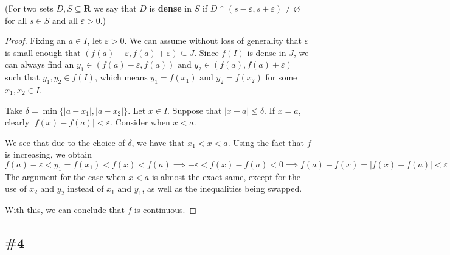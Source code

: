 \documentclass{article}
\newcommand{\R}{\mathbf{R}}
\theoremstyle{plain} %
\numberwithin{thm}{section} %
\theoremstyle{definition}
\begin{document}
    (For two sets $D,S\subseteq \R$ we say that $D$ is \textbf{dense} in $S$ if $D\cap (s-\varepsilon,s+\varepsilon)\neq\varnothing$ for all $s\in S$ and all $\varepsilon>0$.)
    \begin{proof}
        Fixing an \(a \in I\), let \(\varepsilon > 0\). We can assume without loss of generality that \(\varepsilon \) is small enough that \((f(a) - \varepsilon , f(a) + \varepsilon ) \subseteq J\). Since \(f(I)\) is dense in \(J\), we can always find an \(y_1 \in (f(a) - \varepsilon , f(a)) \text{ and } y_2 \in (f(a), f(a) + \varepsilon )\) such that \(y_1 , y_2 \in f(I)\), which means \(y_1 = f(x_1) \text{ and } y_2 = f(x_2)\) for some \(x_1, x_2 \in I\).

        Take \(\delta = \min \{\lvert a - x_1 \rvert , \lvert a - x_2 \rvert \}\). Let \(x \in I\). Suppose that \(\lvert x - a \rvert\leq \delta \). If \(x = a\), clearly \(\lvert f(x) - f(a) \rvert < \varepsilon \). Consider when \(x < a\).

        We see that due to the choice of \(\delta \), we have that \(x_1 < x < a\). Using the fact that \(f\) is increasing, we obtain
        \[
            f(a) - \varepsilon < y_1 = f(x_1) < f(x) < f(a) \implies - \varepsilon < f(x) - f(a) < 0 \implies f(a) - f(x) = \lvert f(x) - f(a) \rvert < \varepsilon 
        \] 
        The argument for the case when \(x < a\) is almost the exact same, except for the use of \(x_2 \text{ and } y_2\) instead of \(x_1\) and \(y_1\), as well as the inequalities being swapped.

        With this, we can conclude that \(f\) is continuous.

    \end{proof}

    \subsection{\#4}
\end{document}
